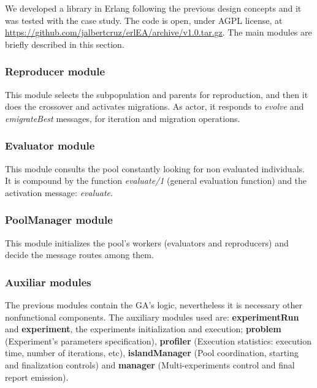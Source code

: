 
We developed a library in Erlang following the previous design concepts and it was tested with the case study. The code is open, under AGPL license, at \url{https://github.com/jalbertcruz/erlEA/archive/v1.0.tar.gz}. The main modules are briefly described in this section.


\subsubsection{Reproducer module}

This module selects the subpopulation and parents for reproduction, and then it does the crossover and activates migrations. As actor, it responds to {\em evolve} and {\em emigrateBest} messages, for iteration and migration operations.

\subsubsection{Evaluator module}

This module consults the pool constantly looking for non evaluated individuals. It is compound by the function {\em evaluate/1} (general evaluation function) and the activation message: {\em evaluate}.

\subsubsection{PoolManager module}

This module initializes the pool’s workers (evaluators and reproducers) and decide the message routes among them.

\subsubsection{Auxiliar modules}

The previous modules contain the GA’s logic, nevertheless it is necessary other nonfunctional components. The auxiliary modules used are: \textbf{experimentRun} and \textbf{experiment}, the experiments initialization and execution; \textbf{problem} (Experiment’s parameters specification), \textbf{profiler} (Execution statistics: execution time, number of iterations, etc), \textbf{islandManager} (Pool coordination, starting and finalization controls) and \textbf{manager} (Multi-experiments control and final report emission).

